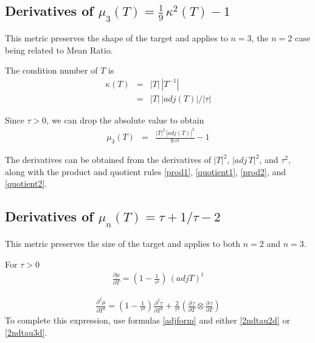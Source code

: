\documentclass{report}
\begin{document}
\subsection{Derivatives of $\mu_3(T)=\frac{1}{9} \, \kappa^2(T) - 1$ \label{s+1} }

\noindent This metric preserves the shape of the target and applies
to $n=3$, the $n=2$ case being related to Mean Ratio. \newline

\noindent The condition number of $T$ is
\begin{eqnarray}
\kappa(T) & = & |T| \, |T^{-1}| \\
          & = & |T| \, |adj(T)| / |\tau|
\end{eqnarray}

\noindent Since $\tau>0$, we can drop the absolute value to obtain
\begin{eqnarray}
\mu_3(T) & = & \frac{|T|^2 \, |adj(T)|^2}{9 \, \tau^2} - 1
\end{eqnarray}

\noindent The derivatives can be obtained from the derivatives of $|T|^2$,
$|adj \, T|^2$, and $\tau^2$, along with the product and quotient rules 
\ref{prod1}, \ref{quotient1}, \ref{prod2}, and \ref{quotient2}. \newline 

\subsection{Derivatives of $\mu_n(T)=\tau + 1/\tau - 2$ \label{z+1} }

\noindent This metric preserves the size of the target and applies
to both $n=2$ and $n=3$. \newline

\noindent For $\tau>0$
\begin{eqnarray}
\frac{\partial \mu}{\partial T} = \left( 1 - \frac{1}{\tau^2} \right) \, (adj T)^t
\end{eqnarray}

\begin{eqnarray}
\frac{\partial^2 \mu}{\partial T^2} = \left( 1 - \frac{1}{\tau^2} \right) \frac{\partial^2 \tau}{\partial T^2} + \frac{2}{\tau^3} \left( \frac{\partial \, \tau}{\partial T} \otimes \frac{\partial \, \tau}{\partial T} \right)
\end{eqnarray}
To complete this expression, use formulas \ref{adjform} and either 
\ref{2ndtau2d} or \ref{2ndtau3d}. \newline
\end{document}
